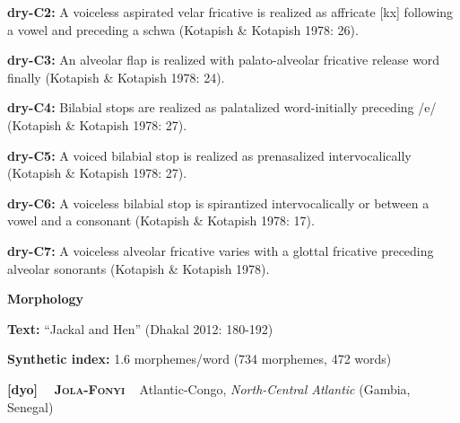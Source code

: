\begin{styleBody}
\textbf{dry-C2: }A voiceless aspirated velar fricative is realized as affricate [kx] following a vowel and preceding a schwa (Kotapish \& Kotapish 1978: 26).
\end{styleBody}

\begin{styleBody}
\textbf{dry-C3: }An alveolar flap is realized with palato-alveolar fricative release word finally (Kotapish \& Kotapish 1978: 24).
\end{styleBody}

\begin{styleBody}
\textbf{dry-C4: }Bilabial stops are realized as palatalized word-initially preceding /e/ (Kotapish \& Kotapish 1978: 27).
\end{styleBody}

\begin{styleBody}
\textbf{dry-C5: }A voiced bilabial stop is realized as prenasalized intervocalically (Kotapish \& Kotapish 1978: 27).
\end{styleBody}

\begin{styleBody}
\textbf{dry-C6: }A voiceless bilabial stop is spirantized intervocalically or between a vowel and a consonant (Kotapish \& Kotapish 1978: 17).
\end{styleBody}

\begin{styleBody}
\textbf{dry-C7: }A voiceless alveolar fricative varies with a glottal fricative preceding alveolar sonorants (Kotapish \& Kotapish 1978).
\end{styleBody}

\begin{styleBody}
\textbf{Morphology}
\end{styleBody}

\begin{styleBody}
\textbf{Text: }“Jackal and Hen” (Dhakal 2012: 180-192)
\end{styleBody}

\begin{styleBody}
\textbf{Synthetic index: }1.6 morphemes/word (734 morphemes, 472 words)
\end{styleBody}

\clearpage\begin{styleBody}
\textbf{[dyo] }\ \ \textbf{\textsc{Jola-Fonyi}}\textbf{\ \ }Atlantic-Congo, \textit{North-Central Atlantic} (Gambia, Senegal)
\end{styleBody}

